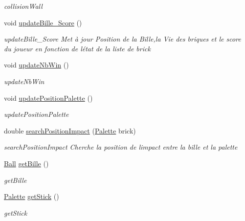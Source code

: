 \begin{DoxyCompactItemize}
\begin{DoxyCompactList}\small\item\em collision\+Wall \end{DoxyCompactList}\item 
\mbox{\label{class_game_manager_af72705118801e4011c3343ac9a8b5335}} 
void \mbox{\hyperlink{class_game_manager_af72705118801e4011c3343ac9a8b5335}{update\+Bille\+\_\+\+Score}} ()
\begin{DoxyCompactList}\small\item\em update\+Bille\+\_\+\+Score Met à jour Position de la Bille,la Vie des briques et le score du joueur en fonction de l\textquotesingle{}état de la liste de brick \end{DoxyCompactList}\item 
void \mbox{\hyperlink{class_game_manager_a10193620d465e7e17285be2533e03f78}{update\+Nb\+Win}} ()
\begin{DoxyCompactList}\small\item\em update\+Nb\+Win \end{DoxyCompactList}\item 
void \mbox{\hyperlink{class_game_manager_aba55e5cb8867a408fc2492d732446ab8}{update\+Position\+Palette}} ()
\begin{DoxyCompactList}\small\item\em update\+Position\+Palette \end{DoxyCompactList}\item 
double \mbox{\hyperlink{class_game_manager_ab6b2748c5280bc20cbed15f32a18deb9}{search\+Position\+Impact}} (\mbox{\hyperlink{class_palette}{Palette}} brick)
\begin{DoxyCompactList}\small\item\em search\+Position\+Impact Cherche la position de l\textquotesingle{}impact entre la bille et la palette \end{DoxyCompactList}\item 
\mbox{\hyperlink{class_ball}{Ball}} \mbox{\hyperlink{class_game_manager_af7c8890b2880ac4a7e9df9b5359d0392}{get\+Bille}} ()
\begin{DoxyCompactList}\small\item\em get\+Bille \end{DoxyCompactList}\item 
\mbox{\hyperlink{class_palette}{Palette}} \mbox{\hyperlink{class_game_manager_ae28734a8c38cffbd7fc2ab4f8a996543}{get\+Stick}} ()
\begin{DoxyCompactList}\small\item\em get\+Stick \end{DoxyCompactList}\item 

\end{DoxyCompactItemize}
